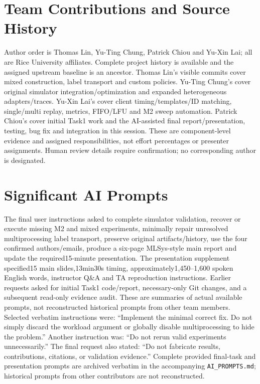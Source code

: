 \documentclass{article}
\begin{document}
\section{Team Contributions and Source History}
Author order is Thomas Lin, Yu-Ting Chung, Patrick Chiou and Yu-Xin Lai; all are Rice University affiliates. Complete project history is available and the assigned upstream baseline is an ancestor. Thomas Lin's visible commits cover mixed construction, label transport and custom policies. Yu-Ting Chung's cover original simulator integration/optimization and expanded heterogeneous adapters/traces. Yu-Xin Lai's cover client timing/templates/ID matching, single/multi replay, metrics, FIFO/LFU and M2 sweep automation. Patrick Chiou's cover initial Task1 work and the AI-assisted final report/presentation, testing, bug fix and integration in this session. These are component-level evidence and assigned responsibilities, not effort percentages or presenter assignments. Human review details require confirmation; no corresponding author is designated.

\section{Significant AI Prompts}
The final user instructions asked to complete simulator validation, recover or execute missing M2 and mixed experiments, minimally repair unresolved multiprocessing label transport, preserve original artifacts/history, use the four confirmed authors/emails, produce a six-page MLSys-style main report and update the required15-minute presentation. The presentation supplement specified15 main slides,13min30s timing, approximately1,450--1,600 spoken English words, instructor Q\&A and TA reproduction instructions. Earlier requests asked for initial Task1 code/report, necessary-only Git changes, and a subsequent read-only evidence audit. These are summaries of actual available prompts, not reconstructed historical prompts from other team members. Selected verbatim instructions were: ``Implement the minimal correct fix. Do not simply discard the workload argument or globally disable multiprocessing to hide the problem.'' Another instruction was: ``Do not rerun valid experiments unnecessarily.'' The final request also stated: ``Do not fabricate results, contributions, citations, or validation evidence.'' Complete provided final-task and presentation prompts are archived verbatim in the accompanying \texttt{AI\_PROMPTS.md}; historical prompts from other contributors are not reconstructed.
\end{document}
